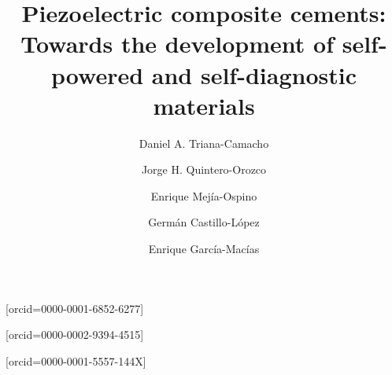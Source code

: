 \documentclass[a4paper,fleqn]{cas-sc}
\begin{document}
\let\WriteBookmarks\relax
\def\floatpagepagefraction{1}
\def\textpagefraction{.001}




\title[mode = title]{Piezoelectric composite cements: Towards the development of self-powered and self-diagnostic materials}  




\author[label1]{Daniel A. Triana-Camacho}[orcid=0000-0001-6852-6277]
\author[label1]{Jorge H. Quintero-Orozco}[orcid=0000-0002-9394-4515]
\author[label2]{Enrique Mejía-Ospino}
\author[label3]{Germán Castillo-López}
\author[label4]{Enrique Garc\'{i}a-Mac\'{i}as}[orcid=0000-0001-5557-144X]

\address[label1]{Ciencia de Materiales Biológicos y Semiconductores (CIMBIOS), Escuela de F\'{i}sica, Universidad Industrial de Santander, Cra 27 Calle 9, Bucaramanga, Colombia.}
\address[label2]{Laboratorio de Espectroscopía Atómica y Molecular, Escuela de Química, Universidad Industrial de Santander, Bucaramanga, Colombia.}
\address[label3]{Escuela de Ingenierías Industriales, Departamento de Ingeniería Civil de Materiales y Fabricación, Calle Dr. Ortiz Ramos s/n, 29071, Málaga, Spain.}
\address[label4]{Department of Structural Mechanics and Hydraulic Engineering, University of Granada, Av. Fuentenueva sn, 18002 Granada, Spain.}

\end{document}
